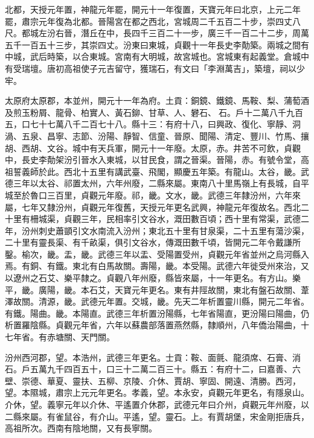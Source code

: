 \begin{pinyinscope}
 北都，天授元年置，神龍元年罷，開元十一年復置，天寶元年曰北京，上元二年罷，肅宗元年復為北都。晉陽宮在都之西北，宮城周二千五百二十步，崇四丈八尺。都城左汾右晉，潛丘在中，長四千三百二十一步，廣三千一百二十二步，周萬五千一百五十三步，其崇四丈。汾東曰東城，貞觀十一年長史李勣築。兩城之間有中城，武后時築，以合東城。宮南有大明城，故宮城也。宮城東有起義堂。倉城中有受瑞壇。唐初高祖使子元吉留守，獲瑞石，有文曰「李淵萬吉」，築壇，祠以少牢。



 太原府太原郡，本並州，開元十一年為府。土貢：銅鏡、鐵鏡、馬鞍、梨、蒲萄酒及煎玉粉屑、龍骨、柏實人、黃石鉚、甘草、人、礬石、石。戶十二萬八千九百五，口七十七萬八千二百七十八。縣十三：有府十八，曰興政、復化、寧靜、洞渦、五泉、昌寧、志節、汾陽、靜智、信童、晉原、聞陽、清定、豐川、竹馬、攘胡、西胡、文谷。城中有天兵軍，開元十一年廢。太原，赤。井苦不可飲，貞觀中，長史李勣架汾引晉水入東城，以甘民食，謂之晉渠。晉陽，赤。有號令堂，高祖誓義師於此。西北十五里有講武臺、飛閣，顯慶五年築。有龍山。太谷，畿。武德三年以太谷、祁置太州，六年州廢，二縣來屬。東南八十里馬嶺上有長城，自平城至於魯口三百里，貞觀元年廢。祁，畿。文水，畿。武德三年隸汾州，六年來屬，七年又隸汾州，貞觀元年復舊，天授元年更名武興，神龍元年復故名。西北二十里有柵城渠，貞觀三年，民相率引文谷水，溉田數百頃；西十里有常渠，武德二年，汾州刺史蕭顗引文水南流入汾州；東北五十里有甘泉渠，二十五里有蕩沙渠，二十里有靈長渠、有千畝渠，俱引文谷水，傳溉田數千頃，皆開元二年令戴謙所鑿。榆次，畿。盂，畿。武德三年以盂、受陽置受州，貞觀元年省並州之烏河縣入焉。有銅、有鐵。東北有白馬故關。壽陽，畿。本受陽。武德六年徙受州來治，又以遼州之石艾、樂平隸之。貞觀八年州廢，縣皆來屬，十一年更名。有方山。樂平，畿。廣陽，畿。本石艾，天寶元年更名。東有井陘故關，東北有盤石故關、葦澤故關。清源，畿。武德元年置。交城，畿。先天二年析置靈川縣，開元二年省。有鐵。陽曲。畿。本陽直。武德三年析置汾陽縣，七年省陽直，更汾陽曰陽曲，仍析置羅陰縣。貞觀元年省，六年以蘇農部落置燕然縣，隸順州，八年僑治陽曲，十七年省。有赤塘關、天門關。



 汾州西河郡，望。本浩州，武德三年更名。士貢：鞍、面氈、龍須席、石膏、消石。戶五萬九千四百五十，口三十二萬二百三十。縣五：有府十二，曰嘉善、六壁、崇德、華夏、靈扶、五柳、京陵、介休、賈胡、寧固、開遠、清勝。西河，望。本隰城，肅宗上元元年更名。孝義，望。本永安，貞觀元年更名，有隱泉山。介休，望。義寧元年以介休、平遙置介休郡，武德元年曰介州，貞觀元年州廢，以二縣來屬。有雀鼠谷，有介山。平遙，望。靈石。上。有賈胡堡，宋金剛拒唐兵，高祖所次。西南有陰地關，又有長寧關。




\end{pinyinscope}
